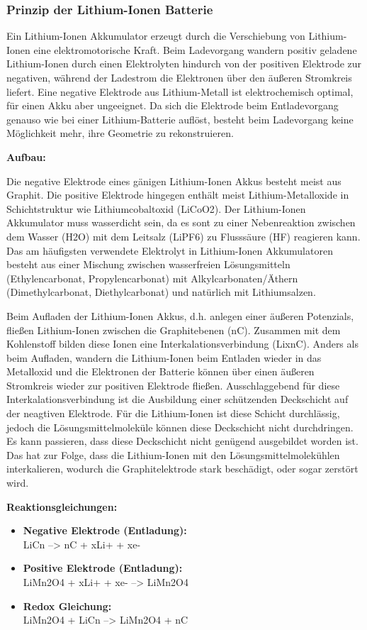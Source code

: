 \subsubsection{Prinzip der Lithium-Ionen Batterie}
Ein Lithium-Ionen Akkumulator erzeugt durch die Verschiebung von Lithium-Ionen eine elektromotorische Kraft.
Beim Ladevorgang wandern positiv geladene Lithium-Ionen durch einen Elektrolyten hindurch von der positiven Elektrode zur negativen, während der Ladestrom die Elektronen über den äußeren Stromkreis liefert. Eine negative Elektrode aus Lithium-Metall ist elektrochemisch optimal, für einen Akku aber ungeeignet. Da sich die Elektrode beim Entladevorgang genauso wie bei einer Lithium-Batterie auflöst, besteht beim Ladevorgang keine Möglichkeit mehr, ihre Geometrie zu rekonstruieren.

\textbf{Aufbau:}

Die negative Elektrode eines gänigen Lithium-Ionen Akkus besteht meist aus Graphit. Die positive Elektrode hingegen enthält meist Lithium-Metalloxide in Schichtstruktur wie Lithiumcobaltoxid (LiCoO2). Der Lithium-Ionen Akkumulator muss wasserdicht sein, da es sont zu einer Nebenreaktion zwischen dem Wasser (H2O) mit dem Leitsalz (LiPF6) zu Flusssäure (HF) reagieren kann. Das am häufigsten verwendete Elektrolyt in Lithium-Ionen Akkumulatoren besteht aus einer Mischung zwischen wasserfreien Lösungsmitteln (Ethylencarbonat, Propylencarbonat) mit Alkylcarbonaten/Äthern (Dimethylcarbonat, Diethylcarbonat) und natürlich mit Lithiumsalzen.

Beim Aufladen der Lithium-Ionen Akkus, d.h. anlegen einer äußeren Potenzials, fließen Lithium-Ionen zwischen die Graphitebenen (nC). Zusammen mit dem Kohlenstoff bilden diese Ionen eine Interkalationsverbindung (LixnC). 
Anders als beim Aufladen, wandern die Lithium-Ionen beim Entladen wieder in das Metalloxid und die Elektronen der Batterie können über einen äußeren Stromkreis wieder zur positiven Elektrode fließen. 
Ausschlaggebend für diese Interkalationsverbindung ist die Ausbildung einer schützenden Deckschicht auf der neagtiven Elektrode. Für die Lithium-Ionen ist diese Schicht durchlässig, jedoch die Lösungsmittelmoleküle können diese Deckschicht nicht durchdringen. Es kann passieren, dass diese Deckschicht nicht genügend ausgebildet worden ist. Das hat zur Folge, dass die Lithium-Ionen mit den Lösungsmittelmolekühlen interkalieren, wodurch die Graphitelektrode stark beschädigt, oder sogar zerstört wird.

\textbf{Reaktionsgleichungen:}
\begin{itemize}
	\item \textbf{Negative Elektrode (Entladung):} \medskip\\
	LiCn  -->  nC + xLi+ + xe-

	\item \textbf{Positive Elektrode (Entladung):}\medskip\\
	LiMn2O4 + xLi+ + xe-  -->  LiMn2O4

	\item \textbf{Redox Gleichung:}\medskip\\
	LiMn2O4 + LiCn  -->  LiMn2O4 + nC
\end{itemize}


